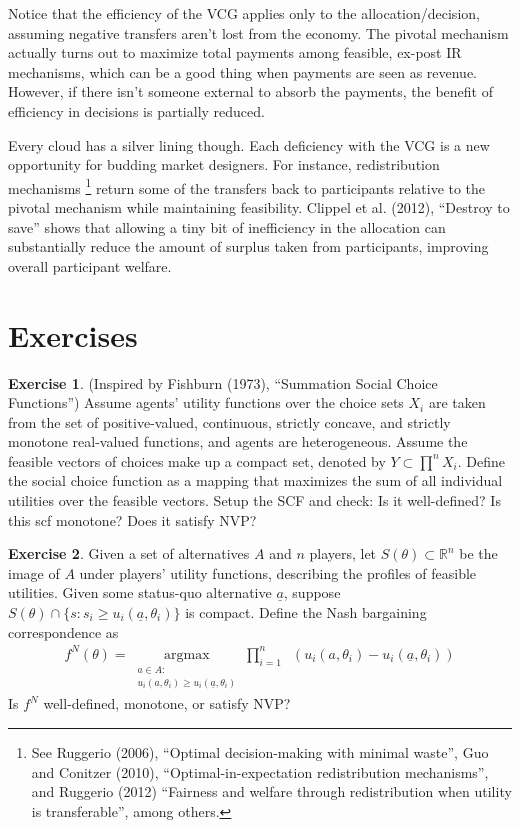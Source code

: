 \documentclass[letter, 10pt]{article}
\theoremstyle{definition}
\newtheorem{exercise}{Exercise}[section]
\newcommand{\R}{\mathbb{R}}
\begin{document}
\begin{spacing}{1.1}
Notice that the efficiency of the VCG applies only to the
allocation/decision, assuming negative transfers aren't lost from the
economy. The pivotal mechanism actually turns out to maximize total
payments among feasible, ex-post IR mechanisms, which can be a good thing when
payments are seen as revenue. However, if there isn't someone external to
absorb the payments, the benefit of efficiency in decisions is partially
reduced. 

Every cloud has a silver lining though. Each deficiency with the VCG is a
new opportunity for budding market designers. For instance, redistribution
mechanisms \footnote{See Ruggerio (2006), ``Optimal decision-making with
  minimal waste'', Guo and Conitzer (2010), ``Optimal-in-expectation
  redistribution mechanisms'', and Ruggerio (2012) ``Fairness and welfare
  through redistribution when utility is transferable'', among others.}
return some of the transfers back to participants relative to the pivotal
mechanism while maintaining feasibility.  Clippel et al. (2012), ``Destroy
to save'' shows that allowing a tiny bit of inefficiency in the allocation
can substantially reduce the amount of surplus taken from participants,
improving overall participant welfare.

\section{Exercises}
\label{sec:exercises}

\begin{exercise}
  (Inspired by Fishburn (1973), ``Summation Social Choice Functions'') Assume
  agents' utility functions over the choice sets $X_i$ are taken from the
  set of positive-valued, continuous, strictly concave, and strictly
  monotone real-valued functions, and agents are heterogeneous. Assume the
  feasible vectors of choices make up a compact set, denoted by $Y \subset
  \prod^n X_i$. Define the social choice function as a mapping that
  maximizes the sum of all individual utilities over the feasible
  vectors. Setup the SCF and check: Is it well-defined? Is this scf
  monotone? Does it satisfy NVP?
\end{exercise}

\begin{exercise}
  Given a set of alternatives $A$ and $n$ players, let $S(\theta) \subset
  \R^n$ be the image of $A$ under players' utility functions, describing
  the profiles of feasible utilities. Given some status-quo alternative
  $\underline{a}$, suppose $S(\theta) \cap \{s: s_i \ge u_i(\underline{a},
  \theta_i)\}$ is compact. Define the Nash bargaining correspondence as
  \begin{align*}
    f^N(\theta) = \underset{\substack{a \in A:\\ u_i(a, \theta_i) \ge
        u_i(\underline{a}, \theta_i)}}{\operatorname{argmax}}
    \prod_{i=1}^n \;\;\left(u_i(a, \theta_i)
    - u_i(\underline{a}, \theta_i)\right)
  \end{align*}
  Is $f^N$ well-defined, monotone, or satisfy NVP?


\end{exercise}
\end{spacing}
\end{document}
